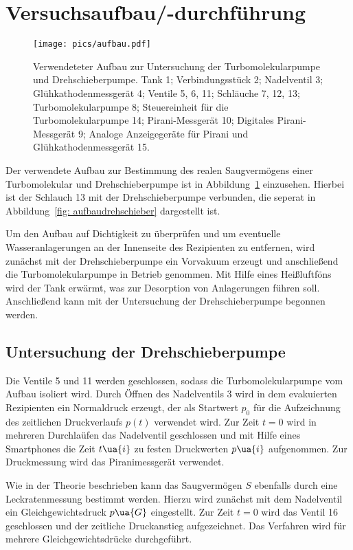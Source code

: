 \section{Versuchsaufbau/-durchführung}
\begin{figure}
  \centering
  \texttt{[image: pics/aufbau.pdf]}
  \caption{Verwendeteter Aufbau zur Untersuchung der Turbomolekularpumpe und Drehschieberpumpe.
Tank 1; Verbindungsstück 2; Nadelventil 3; Glühkathodenmessgerät 4;
Ventile 5, 6, 11; Schläuche 7, 12, 13; Turbomolekularpumpe 8; Steuereinheit für die Turbomolekularpumpe 14;
Pirani-Messgerät 10; Digitales Pirani-Messgerät 9; Analoge Anzeigegeräte für Pirani und Glühkathodenmessgerät 15.}
  \label{fig: aufbau}
\end{figure}
Der verwendete Aufbau zur Bestimmung des realen Saugvermögens einer Turbomolekular und Drehschieberpumpe ist in
Abbildung~\ref{fig: aufbau} einzusehen. Hierbei ist der Schlauch 13 mit der Drehschieberpumpe verbunden, die seperat in
Abbildung~\ref{fig: aufbaudrehschieber} dargestellt ist.

Um den Aufbau auf Dichtigkeit zu überprüfen und um eventuelle Wasseranlagerungen an der Innenseite des Rezipienten zu entfernen,
wird zunächst mit der Drehschieberpumpe ein Vorvakuum erzeugt und anschließend die Turbomolekularpumpe in Betrieb genommen. Mit Hilfe
eines Heißluftföns wird der Tank erwärmt, was zur Desorption von Anlagerungen führen soll. Anschließend kann mit der Untersuchung der
Drehschieberpumpe begonnen werden.
\subsection{Untersuchung der Drehschieberpumpe}
Die Ventile 5 und 11 werden geschlossen, sodass die Turbomolekularpumpe vom Aufbau isoliert wird. Durch Öffnen des Nadelventils 3
wird in dem evakuierten Rezipienten ein Normaldruck erzeugt, der als Startwert $p_0$ für die Aufzeichnung des zeitlichen Druckverlaufs
$p(t)$ verwendet wird. Zur Zeit $t = 0$ wird in mehreren Durchlaüfen das Nadelventil geschlossen
und mit Hilfe eines Smartphones die Zeit $t\ua{i}$ zu festen Druckwerten $p\ua{i}$ aufgenommen. Zur Druckmessung wird das Piranimessgerät
verwendet.

Wie in der Theorie beschrieben kann das Saugvermögen $S$ ebenfalls durch eine Leckratenmessung bestimmt werden. Hierzu wird zunächst mit
dem Nadelventil ein Gleichgewichtsdruck $p\ua{G}$ eingestellt. Zur Zeit $t = 0$ wird das Ventil 16 geschlossen und der zeitliche
Druckanstieg aufgezeichnet. Das Verfahren wird für mehrere Gleichgewichtsdrücke durchgeführt.

